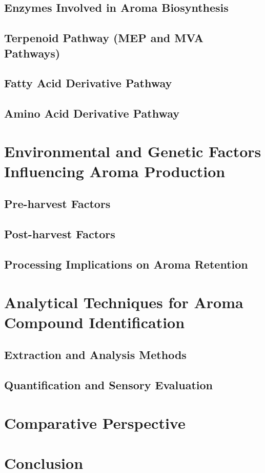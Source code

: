 \subsection{Enzymes Involved in Aroma Biosynthesis}

\subsection{Terpenoid Pathway (MEP and MVA Pathways)}

\subsection{Fatty Acid Derivative Pathway}

\subsection{Amino Acid Derivative Pathway}


\section{Environmental and Genetic Factors Influencing Aroma Production}
\subsection{Pre-harvest Factors}
\subsection{Post-harvest Factors}
\subsection{Processing Implications on Aroma Retention}


\section{Analytical Techniques for Aroma Compound Identification}
\subsection{Extraction and Analysis Methods}
\subsection{Quantification and Sensory Evaluation}

\section{Comparative Perspective}

\section{Conclusion}
